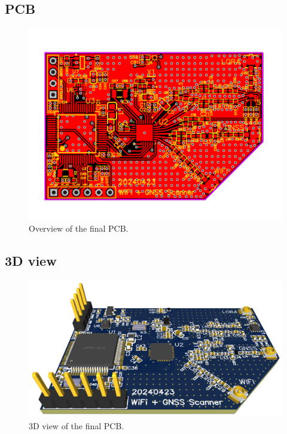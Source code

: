 \begin{appendices}
\begin{landscape}
    \subsection{PCB} \label{app:PCB}
    \begin{figure}[H]  
        \centering
        \includegraphics[width=1\textwidth]{figures/PCB_v3.png}
        \caption{Overview of the final PCB.}
    \end{figure}
\end{landscape}

\begin{landscape}
    \subsection{3D view} \label{app:3DView}
    \begin{figure}[H]  
        \centering
        \includegraphics[width=1.38\textwidth]{figures/PCB_v3_3D.png}
        \caption{3D view of the final PCB.}
    \end{figure}
\end{landscape}

\end{appendices}